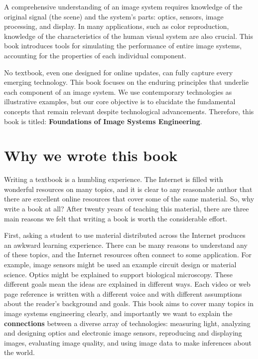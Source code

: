 \documentclass[
  letterpaper,
]{book}
\begin{document}
A comprehensive understanding of an image system requires knowledge of
the original signal (the scene) and the system's parts: optics, sensors,
image processing, and display. In many applications, such as color
reproduction, knowledge of the characteristics of the human visual
system are also crucial. This book introduces tools for simulating the
performance of entire image systems, accounting for the properties of
each individual component.

No textbook, even one designed for online updates, can fully capture
every emerging technology. This book focuses on the enduring principles
that underlie each component of an image system. We use contemporary
technologies as illustrative examples, but our core objective is to
elucidate the fundamental concepts that remain relevant despite
technological advancements. Therefore, this book is titled:
\textbf{Foundations of Image Systems Engineering}.

\section*{Why we wrote this book}\label{why-we-wrote-this-book}


Writing a textbook is a humbling experience. The Internet is filled with
wonderful resources on many topics, and it is clear to any reasonable
author that there are excellent online resources that cover some of the
same material. So, why write a book at all? After twenty years of
teaching this material, there are three main reasons we felt that
writing a book is worth the considerable effort.

First, asking a student to use material distributed across the Internet
produces an awkward learning experience. There can be many reasons to
understand any of these topics, and the Internet resources often connect
to some application. For example, image sensors might be used an example
circuit design or material science. Optics might be explained to support
biological microscopy. These different goals mean the ideas are
explained in different ways. Each video or web page reference is written
with a different voice and with different assumptions about the reader's
background and goals. This book aims to cover many topics in image
systems engineering clearly, and importantly we want to explain the
\textbf{connections} between a diverse array of technologies: measuring
light, analyzing and designing optics and electronic image sensors,
reproducing and displaying images, evaluating image quality, and using
image data to make inferences about the world.
\end{document}
